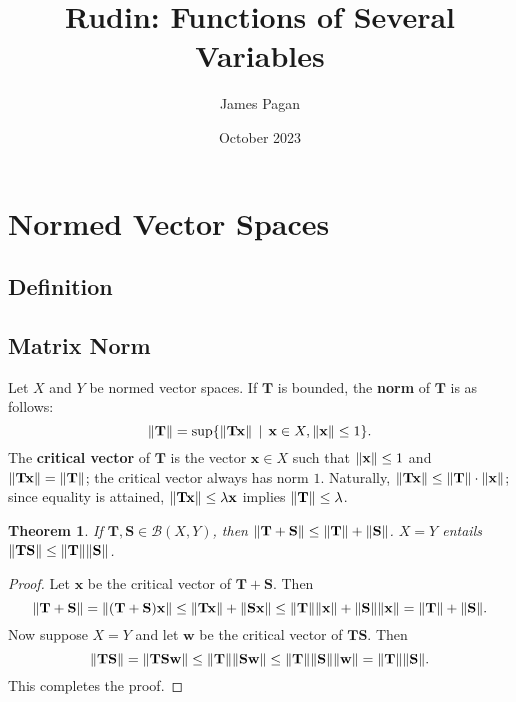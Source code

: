 \documentclass[11pt]{article}
\title{Rudin: Functions of Several Variables}
\author{James Pagan}
\date{October 2023}
\renewcommand{\vec}[1]{\mathbf{#1}}
\newcommand{\mat}[1]{\mathbf{#1}}
\newtheorem{theorem}{Theorem}
\begin{document}
\maketitle
\tableofcontents
\newpage


\section{Normed Vector Spaces}


\subsection{Definition}


\subsection{Matrix Norm}

Let $X$ and $Y$ be normed vector spaces. If $\mat{T}$ is bounded, the \textbf{norm} of $\mat{T}$ is as follows:
\[
	\norm{\mat{T}} = \sup \{ \norm{\mat{T} \vec{x}} \, \mid \, \vec{x} \in X, \norm{\vec{x}} \le 1\}.
\]
The \textbf{critical vector} of $\mat{T}$ is the vector $\vec{x} \in X$ such that $\norm{\vec{x}} \le 1$ and $\norm{\mat{T} \vec{x}} = \norm{\mat{T}}$; the critical vector always has norm $1$. Naturally, $\norm{\mat{T} \vec{x}} \le \norm{\mat{T}} \cdot \norm{\vec{x}}$; since equality is attained, $\norm{\mat{T} \vec{x}} \le \lambda \vec{x}$ implies $\norm{\vec{T}} \le \lambda$.

\begin{theorem}
	If $\mat{T}, \mat{S} \in \mathcal{B}(X, Y)$, then $\norm{\mat{T} + \mat{S}} \le \norm{\mat{T}} + \norm{\mat{S}}$. $X = Y$ entails $\norm{\mat{TS}} \le \norm{\mat{T}} \norm{\mat{S}}$.
\end{theorem}
\begin{adjustwidth}{0.5cm}{}
	\begin{proof}
		Let $\vec{x}$ be the critical vector of $\mat{T} + \mat{S}$. Then
		\[
			\norm{\mat{T} + \mat{S}} = \norm{(\mat{T} + \mat{S})\vec{x}} \le \norm{\mat{T} \vec{x}} + \norm{\mat{S} \vec{x}} \le \norm{\mat{T}} \norm{\vec{x}} + \norm{\mat{S}} \norm{\vec{x}} = \norm{\mat{T}} + \norm{\mat{S}}.
		\]
		Now suppose $X = Y$ and let $\vec{w}$ be the critical vector of $\mat{TS}$. Then
		\[
			\norm{\mat{TS}} = \norm{\mat{TS} \vec{w}} \le \norm{\mat{T}} \norm{\mat{S} \vec{w}} \le \norm{\mat{T}} \norm{\mat{S}} \norm{\vec{w}} = \norm{\mat{T}} \norm{\mat{S}}.
		\]
		This completes the proof.
	\end{proof}
\end{adjustwidth}
\end{document}

